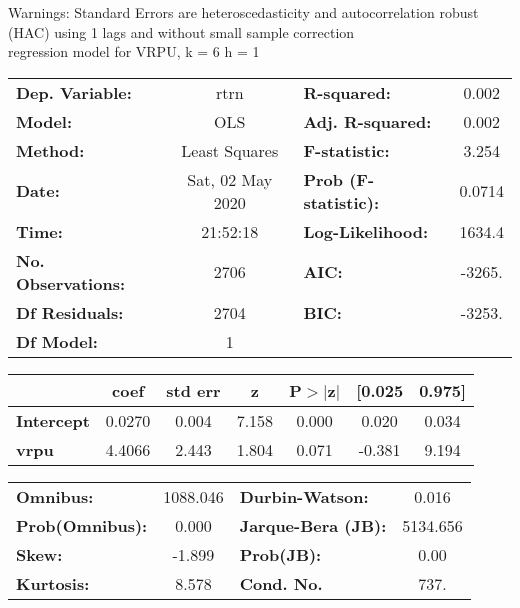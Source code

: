 Warnings: \newline
 [1] Standard Errors are heteroscedasticity and autocorrelation robust (HAC) using 1 lags and without small sample correction\\ 

regression model for VRPU, k = 6 h = 1\begin{center}
\begin{tabular}{lclc}
\toprule
\textbf{Dep. Variable:}    &       rtrn       & \textbf{  R-squared:         } &     0.002   \\
\textbf{Model:}            &       OLS        & \textbf{  Adj. R-squared:    } &     0.002   \\
\textbf{Method:}           &  Least Squares   & \textbf{  F-statistic:       } &     3.254   \\
\textbf{Date:}             & Sat, 02 May 2020 & \textbf{  Prob (F-statistic):} &   0.0714    \\
\textbf{Time:}             &     21:52:18     & \textbf{  Log-Likelihood:    } &    1634.4   \\
\textbf{No. Observations:} &        2706      & \textbf{  AIC:               } &    -3265.   \\
\textbf{Df Residuals:}     &        2704      & \textbf{  BIC:               } &    -3253.   \\
\textbf{Df Model:}         &           1      & \textbf{                     } &             \\
\bottomrule
\end{tabular}
\begin{tabular}{lcccccc}
                   & \textbf{coef} & \textbf{std err} & \textbf{z} & \textbf{P$> |$z$|$} & \textbf{[0.025} & \textbf{0.975]}  \\
\midrule
\textbf{Intercept} &       0.0270  &        0.004     &     7.158  &         0.000        &        0.020    &        0.034     \\
\textbf{vrpu}      &       4.4066  &        2.443     &     1.804  &         0.071        &       -0.381    &        9.194     \\
\bottomrule
\end{tabular}
\begin{tabular}{lclc}
\textbf{Omnibus:}       & 1088.046 & \textbf{  Durbin-Watson:     } &    0.016  \\
\textbf{Prob(Omnibus):} &   0.000  & \textbf{  Jarque-Bera (JB):  } & 5134.656  \\
\textbf{Skew:}          &  -1.899  & \textbf{  Prob(JB):          } &     0.00  \\
\textbf{Kurtosis:}      &   8.578  & \textbf{  Cond. No.          } &     737.  \\
\bottomrule
\end{tabular}
\end{center}

